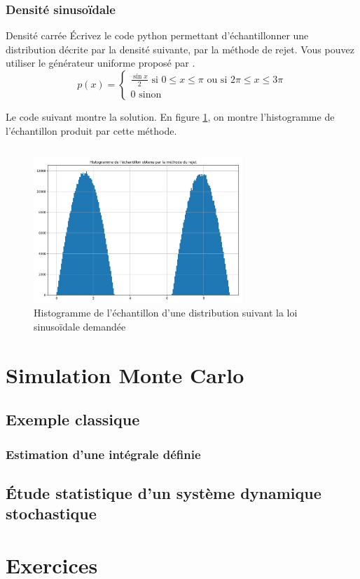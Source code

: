             \subsubsection{Densité sinusoïdale}
                \begin{exercise}{Densité carrée}
                    Écrivez le code python permettant d'échantillonner une distribution décrite par la densité suivante, par la méthode de rejet. Vous pouvez utiliser le générateur uniforme proposé par .
                    \begin{equation}
                        p(x) = 
                        \begin{cases}
                            \frac{\sin x}{2} \text{ si $0\leq x\leq \pi$ ou si  $2\pi\leq x\leq 3\pi$}\\
                            0 \text{ sinon}
                        \end{cases}
                    \end{equation}
                \end{exercise}
                Le code suivant montre la solution. En figure \ref{fig:exercice_rejet_2}, on montre l'histogramme de l'échantillon produit par cette méthode.
                \inputminted{python}{codes/exercice_rejet_2.py}
                \begin{figure}[ht!]
                    \centering
                    \includegraphics[width=0.7\textwidth]{images/exercice_rejet_2.jpg}
                    \caption{Histogramme de l'échantillon d'une distribution suivant la loi sinusoïdale demandée}
                    \label{fig:exercice_rejet_2}
                \end{figure}
    

    \section{Simulation Monte Carlo}
        \subsection{Exemple classique}
            \subsubsection{Estimation d'une intégrale définie}

        \subsection{Étude statistique d'un système dynamique stochastique}
    
    \section{Exercices}